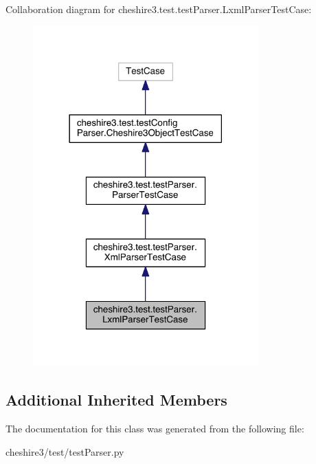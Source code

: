 Collaboration diagram for cheshire3.\-test.\-test\-Parser.\-Lxml\-Parser\-Test\-Case\-:
\nopagebreak
\begin{figure}[H]
\begin{center}
\leavevmode
\includegraphics[width=246pt]{classcheshire3_1_1test_1_1test_parser_1_1_lxml_parser_test_case__coll__graph}
\end{center}
\end{figure}
\subsection*{Additional Inherited Members}


The documentation for this class was generated from the following file\-:\begin{DoxyCompactItemize}
\item 
cheshire3/test/test\-Parser.\-py\end{DoxyCompactItemize}
